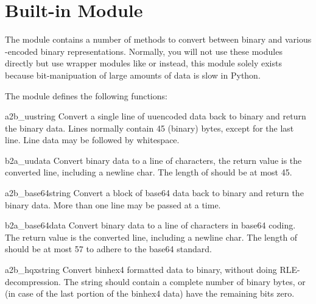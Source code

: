\section{Built-in Module }



The  module contains a number of methods to convert
between binary and various \ASCII{}-encoded binary
representations. Normally, you will not use these modules directly but
use wrapper modules like  or
 instead, this module solely
exists because bit-manipuation of large amounts of data is slow in
Python.

The  module defines the following functions:

\begin{funcdesc}{a2b_uu}{string}
Convert a single line of uuencoded data back to binary and return the
binary data. Lines normally contain 45 (binary) bytes, except for the
last line. Line data may be followed by whitespace.
\end{funcdesc}

\begin{funcdesc}{b2a_uu}{data}
Convert binary data to a line of \ASCII{} characters, the return value
is the converted line, including a newline char. The length of
 should be at most 45.
\end{funcdesc}

\begin{funcdesc}{a2b_base64}{string}
Convert a block of base64 data back to binary and return the
binary data. More than one line may be passed at a time.
\end{funcdesc}

\begin{funcdesc}{b2a_base64}{data}
Convert binary data to a line of \ASCII{} characters in base64 coding.
The return value is the converted line, including a newline char.
The length of  should be at most 57 to adhere to the base64
standard.
\end{funcdesc}

\begin{funcdesc}{a2b_hqx}{string}
Convert binhex4 formatted \ASCII{} data to binary, without doing
RLE-decompression. The string should contain a complete number of
binary bytes, or (in case of the last portion of the binhex4 data)
have the remaining bits zero.
\end{funcdesc}

